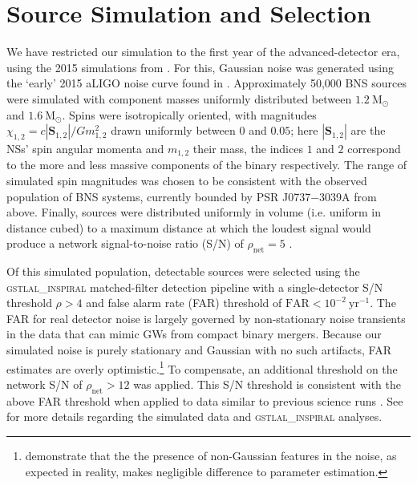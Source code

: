 \section{Source Simulation and Selection}\label{sec:sources}

We have restricted our simulation to the first year of the advanced-detector era, using the 2015 simulations from \citet{Singer_2014}. For this, Gaussian noise was generated using the `early' 2015 aLIGO noise curve found in \citet{Barsotti:2012}. Approximately 50,000 BNS sources were simulated with component masses uniformly distributed between $1.2~\mathrm{M}_\odot$ and $1.6~\mathrm{M}_\odot$. Spins were isotropically oriented, with magnitudes $\chi_{1,2} = c |\mathbf{S}_{1,2}|/G m_{1,2}^2$ drawn uniformly between $0$ and $0.05$; here $|\mathbf{S}_{1,2}|$ are the NSs' spin angular momenta and $m_{1,2}$ their mass, the indices $1$ and $2$ correspond to the more and less massive components of the binary respectively.  The range of simulated spin magnitudes was chosen to be consistent with the observed population of BNS systems, currently bounded by PSR J0737$-$3039A \citep{Burgay_2003,Brown_2012} from above.  Finally, sources were distributed uniformly in volume (i.e. uniform in distance cubed) to a maximum distance at which the loudest signal would produce a network signal-to-noise ratio (S/N) of $\rho_\mathrm{net} = 5$ \citep{Singer_2014}.

Of this simulated population, detectable sources were selected using the \textsc{gstlal\_inspiral} matched-filter detection pipeline \citep{Cannon_2012} with a single-detector S/N threshold $\rho>4$ and false alarm rate (FAR) threshold of $\mathrm{FAR}<10^{-2}~\mathrm{yr}^{-1}$.  The FAR for real detector noise is largely governed by non-stationary noise transients in the data that can mimic GWs from compact binary mergers.  Because our simulated noise is purely stationary and Gaussian with no such artifacts, FAR estimates are overly optimistic.\footnote{\citet{Berry_2015} demonstrate that the the presence of non-Gaussian features in the noise, as expected in reality, makes negligible difference to parameter estimation.} To compensate, an additional threshold on the network S/N of $\rho_\mathrm{net} > 12$ was applied. This S/N threshold is consistent with the above FAR threshold when applied to data similar to previous science runs \cite{2013arXiv1304.0670L,Berry_2014}. See \citet{Singer_2014} for more details regarding the simulated data and \textsc{gstlal\_inspiral} analyses.
  
